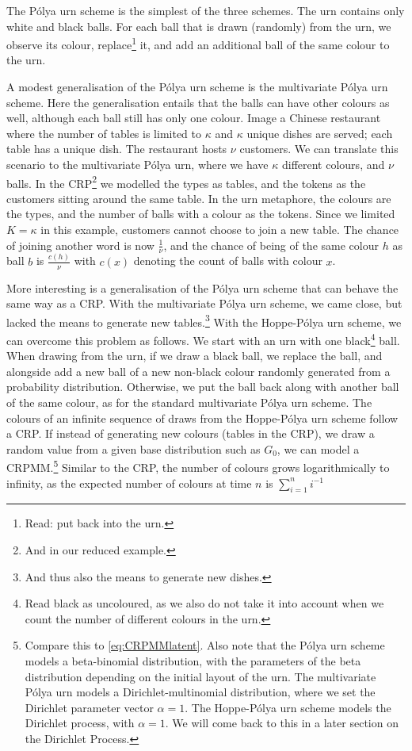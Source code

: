 The P\'olya urn scheme\cite{Johnson1977Urn} is the simplest of the three schemes. The urn contains only white and black balls. For each ball that is drawn (randomly) from the urn, we observe its colour,  replace\footnote{Read: put back into the urn.} it, and add an additional ball of the same colour to the urn. 

A modest generalisation of the P\'olya urn scheme is the multivariate P\'olya urn scheme. Here the generalisation entails that the balls can have other colours as well, although each ball still has only one colour. Image a Chinese restaurant where the number of tables is limited to $\kappa$ and $\kappa$ unique dishes are served; each table has a unique dish. The restaurant hosts $\nu$ customers. We can translate this scenario to the multivariate P\'olya urn, where we have $\kappa$ different colours, and $\nu$ balls. In the CRP\footnote{And in our reduced example.} we modelled the types as tables, and the tokens as the customers sitting around the same table. In the urn metaphore, the colours are the types, and the number of balls with a colour as the tokens. Since we limited $K=\kappa$ in this example, customers cannot choose to join a new table. The chance of joining another word is now $\frac{1}{\nu}$, and the chance of being of the same colour $h$ as ball $b$ is $\frac{c(h)}{\nu}$ with $c(x)$ denoting the count of balls with colour $x$. 

More interesting is a generalisation of the P\'olya urn scheme that can behave the same way as a CRP. With the multivariate P\'olya urn scheme, we came close, but lacked the means to generate new tables.\footnote{And thus also the means to generate new dishes.} With the Hoppe-P\'olya urn scheme\cite{Hoppe1984Polya}, we can overcome this problem as follows. We start with an urn with one black\footnote{Read black as uncoloured, as we also do not take it into account when we count the number of different colours in the urn.} ball. When drawing from the urn, if we draw a black ball, we replace the ball, and alongside add a new ball of a new non-black colour randomly generated from a probability distribution. Otherwise, we put the ball back along with another ball of the same colour, as for the standard multivariate P\'olya urn scheme. The colours of an infinite sequence of draws from the Hoppe-P\'olya urn scheme follow a CRP. If instead of generating new colours (tables in the CRP), we draw a random value from a given base distribution such as $G_0$, we can model a CRPMM.\footnote{Compare this to \cref{eq:CRPMMlatent}. Also note that the P\'olya urn scheme models a beta-binomial distribution, with the parameters of the beta distribution depending on the initial layout of the urn. The multivariate P\'olya urn models a Dirichlet-multinomial distribution, where we set the Dirichlet parameter vector $\alpha=1$. The Hoppe-P\'olya urn scheme models the Dirichlet process, with $\alpha=1$. We will come back to this in a later section on the Dirichlet Process.} Similar to the CRP, the number of colours grows logarithmically to infinity, as the expected number of colours at time $n$ is $\sum_{i=1}^n i^{-1}$

